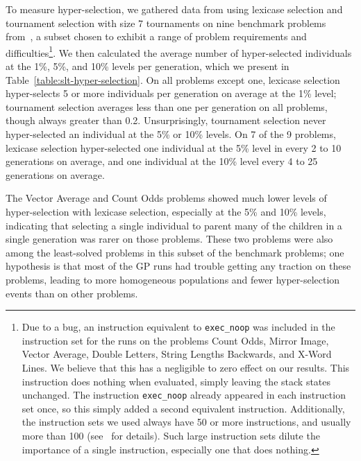 \documentclass{sig-alternate}
\begin{document}
To measure hyper-selection, we gathered data from using lexicase selection and tournament selection with size 7 tournaments on nine benchmark problems from~\cite{Helmuth:2015:GECCO, Helmuth:2015:dissertation}, a subset chosen to exhibit a range of problem requirements and difficulties\footnote{\label{footnote:autoconstructive-rand-integer-bug}Due to a bug, an instruction equivalent to \texttt{exec_noop} was included in the instruction set for the runs on the problems Count Odds, Mirror Image, Vector Average, Double Letters, String Lengths Backwards, and X-Word Lines. We believe that this has a negligible to zero effect on our results. This instruction does nothing when evaluated, simply leaving the stack states unchanged. The instruction \texttt{exec_noop} already appeared in each instruction set once, so this simply added a second equivalent instruction. Additionally, the instruction sets we used always have 50 or more instructions, and usually more than 100 (see~\cite{Helmuth:2015:GECCO} for details). Such large instruction sets dilute the importance of a single instruction, especially one that does nothing.}.
We then calculated the average number of hyper-selected individuals at the 1\%, 5\%, and 10\% levels per generation, which we present in Table~\ref{table:slt-hyper-selection}. On all problems except one, lexicase selection hyper-selects 5 or more individuals per generation on average at the 1\% level; tournament selection averages less than one per generation on all problems, though always greater than 0.2. Unsurprisingly, tournament selection never hyper-selected an individual at the 5\% or 10\% levels.
On 7 of the 9 problems, lexicase selection hyper-selected one individual at the 5\% level in every 2 to 10 generations on average, and one individual at the 10\% level every 4 to 25 generations on average. 

The Vector Average and Count Odds problems showed much lower levels of hyper-selection with lexicase selection, especially at the 5\% and 10\% levels, indicating that selecting a single individual to parent many of the children in a single generation was rarer on those problems. These two problems were also among the least-solved problems in this subset of the benchmark problems; one hypothesis is that most of the GP runs had trouble getting any traction on these problems, leading to more homogeneous populations and fewer hyper-selection events than on other problems.

\end{document}
